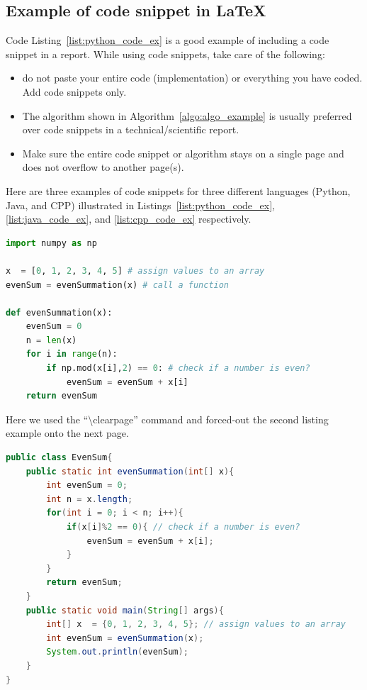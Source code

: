 \begin{itemize}
\section{Example of code snippet  in \LaTeX}

Code Listing~\ref{list:python_code_ex} is a good example of including a code snippet in a report. While using code snippets, take care of the following:
\begin{itemize}
    \item do not paste your entire code (implementation) or everything you have coded. Add code snippets only. 
    \item The algorithm shown in Algorithm~\ref{algo:algo_example} is usually preferred over code snippets in a technical/scientific report. 
    \item Make sure the entire code snippet or algorithm stays on a single page and does not overflow to another page(s).  
\end{itemize}

Here are three examples of code snippets for three different languages (Python, Java, and CPP) illustrated in Listings~\ref{list:python_code_ex}, \ref{list:java_code_ex}, and \ref{list:cpp_code_ex} respectively.  

\begin{lstlisting}[language=Python, caption={Code snippet in \LaTeX ~and  this is a Python code example}, label=list:python_code_ex]
import numpy as np

x  = [0, 1, 2, 3, 4, 5] # assign values to an array
evenSum = evenSummation(x) # call a function

def evenSummation(x):
    evenSum = 0
    n = len(x)
    for i in range(n):
        if np.mod(x[i],2) == 0: # check if a number is even?
            evenSum = evenSum + x[i]
    return evenSum
\end{lstlisting}

Here we used  the ``\textbackslash clearpage'' command and forced-out the second listing example onto the next page. 
\clearpage  %
\begin{lstlisting}[language=Java, caption={Code snippet in \LaTeX ~and  this is a Java code example}, label=list:java_code_ex]
public class EvenSum{ 
    public static int evenSummation(int[] x){
        int evenSum = 0;
        int n = x.length;
        for(int i = 0; i < n; i++){
            if(x[i]%2 == 0){ // check if a number is even?
                evenSum = evenSum + x[i];
            }
        }
        return evenSum;     
    }
    public static void main(String[] args){ 
        int[] x  = {0, 1, 2, 3, 4, 5}; // assign values to an array
        int evenSum = evenSummation(x);
        System.out.println(evenSum);
    } 
} 
\end{lstlisting}



\end{itemize}
